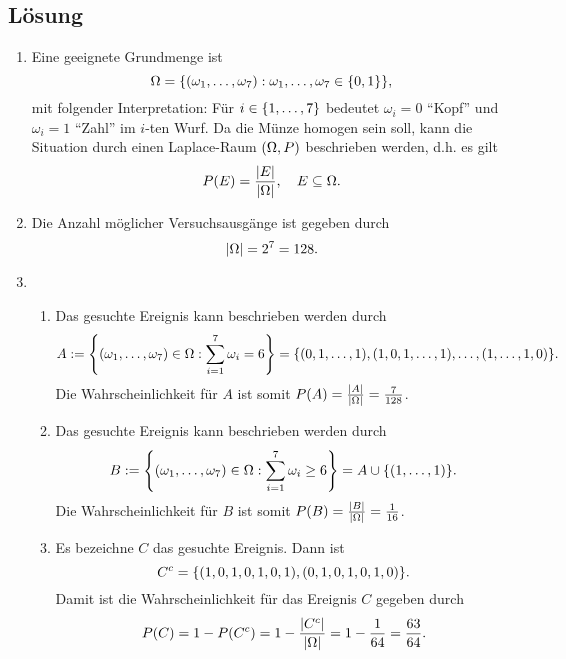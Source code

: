 \documentclass{exercise}
\begin{document}
    \subsection*{Lösung}
    \begin{enumerate}
        \item Eine geeignete Grundmenge ist
        \[
            \Omega = \braces*{\parentheses*{\omega_1, \ldots, \omega_7} : \omega_1, \ldots, \omega_7 \in \braces*{0, 1}},
        \]
        mit folgender Interpretation:
        Für \(i \in \braces*{1, \ldots, 7}\) bedeutet \(\omega_i = 0\) ``Kopf'' und \(\omega_i = 1\) ``Zahl'' im \(i\)-ten Wurf.
        Da die Münze homogen sein soll, kann die Situation durch einen Laplace-Raum \(\parentheses*{\Omega, P}\) beschrieben werden, d.h. es gilt
        \[
            P\parentheses*{E} = \frac{\absolute*{E}}{\absolute*{\Omega}}, \quad E \subseteq \Omega.
        \]
        \item Die Anzahl möglicher Versuchsausgänge ist gegeben durch
        \[
            \absolute*{\Omega} = 2^7 = 128.
        \]
        \item
        \begin{enumerate}
            \item Das gesuchte Ereignis kann beschrieben werden durch
            \[
                A := \braces*{\parentheses*{\omega_1, \ldots, \omega_7} \in \Omega : \sum_{i = 1}^7 \omega_i = 6} = \braces*{\parentheses*{0, 1, \ldots, 1}, \parentheses*{1, 0, 1, \ldots, 1}, \ldots, \parentheses*{1, \ldots, 1, 0}}.
            \]
            Die Wahrscheinlichkeit für \(A\) ist somit \(P\parentheses*{A} = \frac{\absolute*{A}}{\absolute*{\Omega}} = \frac{7}{128}\).
            \item Das gesuchte Ereignis kann beschrieben werden durch
            \[
                B := \braces*{\parentheses*{\omega_1, \ldots, \omega_7} \in \Omega : \sum_{i = 1}^7 \omega_i \ge 6} = A \cup \braces*{\parentheses*{1, \ldots, 1}}.
            \]
            Die Wahrscheinlichkeit für \(B\) ist somit \(P\parentheses*{B} = \frac{\absolute*{B}}{\absolute*{\Omega}} = \frac{1}{16}\).
            \item Es bezeichne \(C\) das gesuchte Ereignis.
            Dann ist
            \[
                C^c = \braces*{\parentheses*{1, 0, 1, 0, 1, 0, 1}, \parentheses*{0, 1, 0, 1, 0, 1, 0}}.
            \]
            Damit ist die Wahrscheinlichkeit für das Ereignis \(C\) gegeben durch
            \[
                P\parentheses*{C} = 1 - P\parentheses*{C^c} = 1 - \frac{\absolute*{C^c}}{\absolute*{\Omega}} = 1 - \frac{1}{64} = \frac{63}{64}.
            \]
        \end{enumerate}
    \end{enumerate}
\end{document}
